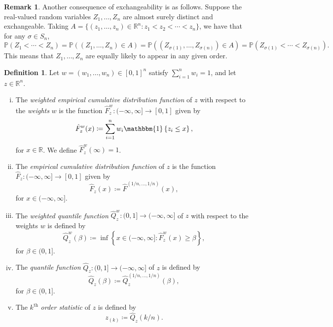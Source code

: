 \documentclass[11pt, titlepage]{article} %
\newcommand{\R}{\mathrm}
\newcommand{\Prob}[1]{\mathbb{P}\left( #1 \right)}
\newcommand{\Ind}[1]{\mathbbm{1}\left\{ #1 \right\}}
\numberwithin{equation}{section}
\theoremstyle{definition}
\newtheorem{definition}{Definition}
\newtheorem{remark}{Remark}
\numberwithin{theorem}{section}
\numberwithin{lemma}{section}
\numberwithin{corollary}{section}
\numberwithin{proposition}{section}
\numberwithin{definition}{section}
\numberwithin{remark}{section}
\begin{document}
\begin{remark}
    Another consequence of exchangeability is as follows. Suppose the real-valued random variables \(Z_1, \ldots, Z_n\) are almost surely distinct and exchangeable. Taking \(A = \{(z_1, \ldots, z_n) \in \mathbb{R}^n : z_1 < z_2 < \cdots < z_n \}\), we have that for any \(\sigma \in S_n\), \[\Prob{Z_1 < \cdots < Z_n} = \Prob{(Z_1, \ldots, Z_n) \in A} = \Prob{(Z_{\sigma(1)}, \ldots, Z_{\sigma(n)}) \in A} = \Prob{Z_{\sigma(1)} < \cdots < Z_{\sigma(n)}}.\] This means that \(Z_1, \ldots, Z_n\) are equally likely to appear in any given order.
\label{rmk:exch_ordering}
\end{remark}


\begin{definition}
    Let \(w = (w_1, \ldots, w_n) \in [0,1]^n\) satisfy \(\sum_{i=1}^n w_i = 1\), and let \(z \in \mathbb{R}^n\). 
    \begin{enumerate}[(i)] \itemsep0em
        \item The \textit{weighted empirical cumulative distribution function} of \(z\) with respect to the \textit{weights} \(w\) is the function \(\hat{F}^w_z: (-\infty, \infty] \to [0,1]\) given by \[\hat{F}^{w}_z(x) \coloneqq \sum_{i=1}^n w_i \Ind{z_i \leq x},  \] for \(x \in \mathbb{R}\). We define \(\hat{F}^w_z(\infty) = 1\).
        \item The \textit{empirical cumulative distribution function} of \(z\) is the function \(\hat{F}_z: (-\infty, \infty] \to [0,1]\) given by \[\hat{F}_z(x) \coloneqq \hat{F}^{(1/n, \ldots, 1/n)}(x), \] for \(x \in (-\infty, \infty]\).
        \item The \textit{weighted quantile function} \(\hat{Q}^w_z:(0,1] \to (-\infty, \infty]\) of \(z\) with respect to the weights \(w\) is defined by \[\hat{Q}^w_z(\beta) \coloneqq \inf \left\{ x \in (-\infty, \infty]: \hat{F}^w_z(x) \geq \beta \right\}, \] for \(\beta \in (0,1]\).
        \item The \textit{quantile function} \(\hat{Q}_z:(0,1] \to (-\infty, \infty]\) of \(z\) is defined by \[\hat{Q}_z(\beta) \coloneqq \hat{Q}^{(1/n, \ldots, 1/n)}_z(\beta), \] for \(\beta \in (0,1]\).
        \item The \(k^{\R{th}}\) \textit{order statistic} of \(z\) is defined by \[z_{(k)} \coloneqq \hat{Q}_z(k/n).\]
    \end{enumerate}
\label{defn:empirical_cdfquantile}
\end{definition}
\end{document}
